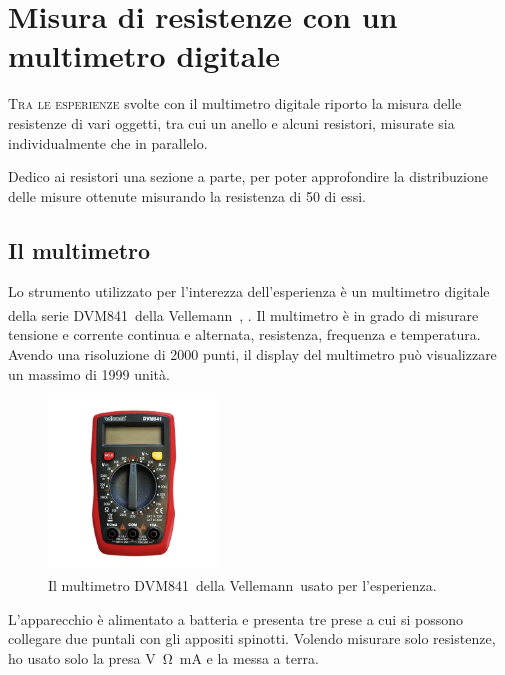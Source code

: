 \newcommand{\dvm}{DVM841}
\newcommand{\vell}{Vellemann\textsuperscript{\tiny\textregistered}}

\chapter{Misura di resistenze con un multimetro digitale}\label{ch:mult}
    \lettrine[loversize=0.08, lines=2]{T}{ra le esperienze} svolte con il multimetro digitale riporto la misura delle resistenze di vari oggetti, tra cui un anello e alcuni resistori, misurate sia individualmente che in parallelo.
    
    Dedico ai resistori una sezione a parte, per poter approfondire la distribuzione delle misure ottenute misurando la resistenza di \num{50} di essi.

    \section{Il multimetro}
        Lo strumento utilizzato per l'interezza dell'esperienza è un multimetro digitale della serie \dvm\ della \vell\ \cite{velleman-dvm841}, . Il multimetro è in grado di misurare tensione e corrente continua e alternata, resistenza, frequenza e temperatura. Avendo una risoluzione di \num{2000} punti, il display del multimetro può visualizzare un massimo di \num{1999} unità.
        \begin{figure}
            \centering
            \includegraphics[width = 0.4\textwidth]{images/multimetro/multimetro.jpg}
            \caption{Il multimetro \dvm\ della \vell\ usato per l'esperienza.}
            \label{fig:mul:multimetro}
        \end{figure}

        L'apparecchio è alimentato a batteria e presenta tre prese a cui si possono collegare due puntali con gli appositi spinotti. Volendo misurare solo resistenze, ho usato solo la presa \unit{\volt\ohm\milli\ampere} e la messa a terra.

